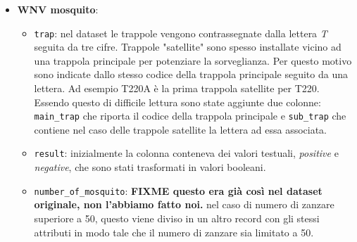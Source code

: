 \begin{itemize}
\begin{itemize}
            \item \texttt{result\_speed}, \texttt{avg\_speed}, 
            \texttt{max5\_speed}, \texttt{max2\_speed}: i valori di velocità 
            sono stati convertiti da miglia orarie (mph) a chilometri orari 
            (\si[per-mode=symbol]{\km\per\hour}).
                
            \item \texttt{code\_sum} %

        \end{itemize}
	
	\item \textbf{WNV mosquito}:
	
	\begin{itemize}
		
		\item \texttt{trap}: nel dataset le trappole vengono contrassegnate 
		dalla lettera \textit{T} seguita da tre cifre. Trappole "satellite" 
		sono spesso installate vicino ad una trappola principale per potenziare 
		la sorveglianza. Per questo motivo sono indicate dallo stesso codice 
		della trappola principale seguito da una lettera. Ad esempio T220A è la 
		prima trappola satellite per T220. Essendo questo di difficile lettura 
		sono state aggiunte due colonne: \texttt{main\_trap} che riporta il 
		codice della trappola principale e \texttt{sub\_trap} che contiene nel 
		caso delle trappole satellite la lettera ad essa associata.
		
		\item \texttt{result}: inizialmente la colonna conteneva dei valori  
		testuali, \textit{positive} e \textit{negative}, che sono stati 
		trasformati in valori booleani.  
		
		\item \texttt{number\_of\_mosquito}: \textbf{FIXME questo era già così 
		nel dataset originale, non l'abbiamo fatto noi.} nel caso di numero di 
		zanzare superiore a 50, questo viene diviso in un altro record con gli 
		stessi attributi in modo tale che il numero di zanzare sia limitato a 
		50.  
			
	\end{itemize}
	
\end{itemize}

